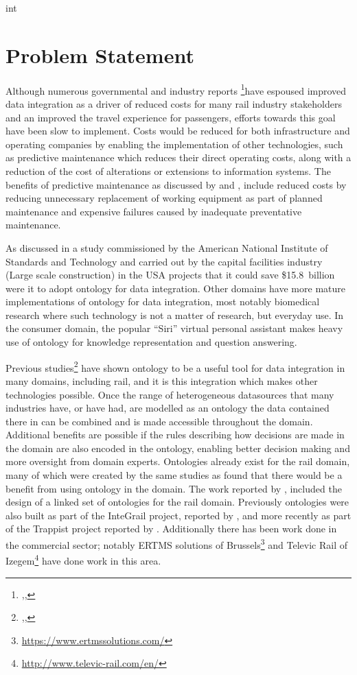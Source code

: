 int
\chapter{Problem Statement}\label{ch:probstate}
Although numerous governmental and industry reports \footnote{\citep{RDG2017},\citep{DepartmentforTransport2011},\citep{TechnicalStrategyLeadershipGroup2012b}}have espoused improved data integration as a driver of reduced costs for many rail industry stakeholders and an improved the travel experience for passengers, efforts towards this goal have been slow to implement. Costs would be reduced for both infrastructure and operating companies by enabling the implementation of other technologies, such as predictive maintenance which reduces their direct operating costs, along with a reduction of the cost of alterations or extensions to information systems. The benefits of predictive maintenance as discussed by \citet{QRE:QRE1634} and \citet{RDG2017}, include reduced costs by reducing unnecessary replacement of working equipment as part of planned maintenance and expensive failures caused by inadequate preventative maintenance. 

As discussed in a study commissioned by the American National Institute of Standards and Technology and carried out by \citep{Gallaher2004} the capital facilities industry (Large scale construction) in the USA projects that it could save \$15.8~billion were it to adopt ontology for data integration. Other domains have more mature implementations of ontology for data integration, most notably biomedical research where such technology is not a matter of research, but everyday use. In the consumer domain, the popular ``Siri'' virtual personal assistant makes heavy use of ontology for knowledge representation and question answering.

Previous studies\footnote{\citep{Verstichel2011a},\citep{Tutcher2013},\citep{Morris}} have shown ontology to be a useful tool for data integration in many domains, including rail, and it is this integration which makes other technologies possible. Once the range of heterogeneous datasources that many industries have, or have had, are modelled as an ontology the data contained there in can be combined and is made accessible throughout the domain. Additional benefits are possible if the rules describing how decisions are made in the domain are also encoded in the ontology, enabling better decision making and more oversight from domain experts. Ontologies already exist for the rail domain, many of which were created by the same studies as found that there would be a benefit from using ontology in the domain. The work reported by \citet{Tutcher2015}, included the design of a linked set of ontologies for the rail domain. Previously ontologies were also built as part of the InteGrail project, reported by \citet{Kopf2010}, and more recently as part of the Trappist project reported by . Additionally there has been work done in the commercial sector; notably ERTMS solutions of Brussels\footnote{\url{https://www.ertmssolutions.com/}} and Televic Rail of Izegem\footnote{\url{http://www.televic-rail.com/en/}} have done work in this area.

